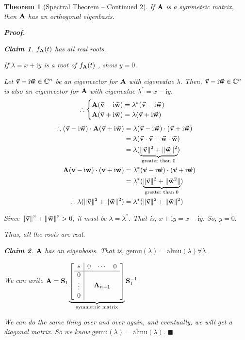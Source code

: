 \documentclass[12pt, a4paper]{article}
\newtheorem{thm}{Theorem}[subsection]
\newtheorem{clm}{\indent Claim}[section]
\newenvironment*{prf}{\par\indent\textbf{\textit{Proof. }}}{\hfill $\blacksquare$\par}
\def\C{{\mathbb{C}}}
\def\i{{\mathrm{i}}}
\def\almu{\mathrm{almu}}
\def\gemu{\mathrm{gemu}}
\def\vecv{\va{v}}
\def\vecw{\va{w}}
\def\matrixA{\vb{A}}
\def\matrixS{\vb{S}}
\begin{document}
\begin{thm}[Spectral Theorem -- Continued 2]
	If $\matrixA$ is a symmetric matrix, then $\matrixA$ has an orthogonal eigenbasis.
	\begin{prf}
		\begin{clm}
			$f_{\matrixA}(t)$ has all real roots. 
		\end{clm}\par 
		\textit{If $\lambda=x+\i y$ is a root of $f_{\matrixA}(t)$ , show $y=0$.}\par Let $\vecv+\i\vecw\in\C^n$ be an eigenvector for $\matrixA$ with eigenvalue $\lambda.$ Then, $\vecv-\i\vecw\in\C^n$ is also an eigenvector for $\matrixA$ with eigenvalue $\lambda^*=x-\i y.$ \[\therefore\begin{cases}\matrixA(\vecv-\i\vecw)=\lambda^*(\vecv-\i\vecw)\\\matrixA(\vecv+\i\vecw)=\lambda(\vecv+\i\vecw)\end{cases}\]\[\begin{aligned}\therefore(\vecv-\i\vecw)\cdot\matrixA(\vecv+\i\vecw)&=\lambda(\vecv-\i\vecw)\cdot(\vecv+\i\vecw)\\&=\lambda(\vecv\cdot\vecv+\vecw\cdot\vecw)\\&=\lambda(\underbrace{\|\vecv\|^2+\|\vecw\|^2}_{\text{greater than }0})\\\matrixA(\vecv-\i\vecw)\cdot(\vecv+\i\vecw)&=\lambda^*(\vecv-\i\vecw)\cdot(\vecv+\i\vecw)\\&=\lambda^*(\underbrace{\|\vecv\|^2+\|\vecw^2\|}_{\text{greater than }0})\\\therefore\lambda(\|\vecv\|^2+\|\vecw\|^2)&=\lambda^*(\|\vecv\|^2+\|\vecw\|^2)\end{aligned}\]\par Since $\|\vecv\|^2+\|\vecw\|^2>0,$ it must be $\lambda=\lambda^*.$ That is, $x+\i y=x-\i y.$ So, $y=0.$\par Thus, all the roots are real. 
		\begin{clm} $\matrixA$ has an eigenbasis. That is, $\gemu(\lambda)=\almu(\lambda)\forall\lambda.$\end{clm}\par 
		We can write $\matrixA=\matrixS_1\underbrace{\left[\begin{array}{c|c}*&\mqty{0&\cdots&0}\\\hline\mqty{0\\\vdots\\0}&\matrixA_{n-1}\end{array}\right]}_{\text{symmetric matrix}}\matrixS_1^{-1}$\par We can do the same thing over and over again, and eventually, we will get a diagonal matrix. So we know $\gemu(\lambda)=\almu(\lambda).$
	\end{prf}
\end{thm}
\end{document}
